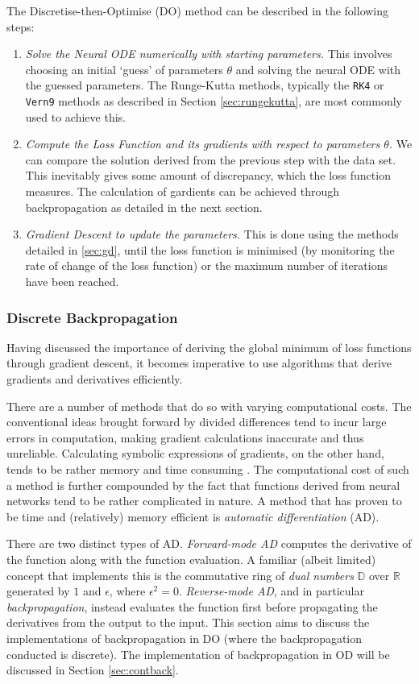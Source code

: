 \documentclass[a4paper,11pt,titlepage]{article}
\theoremstyle{definition}
\theoremstyle{plain}
\theoremstyle{remark}
\begin{document}
The Discretise-then-Optimise (DO) method can be described in the following steps:
\begin{enumerate}
    \item \textit{Solve the Neural ODE numerically with starting parameters.} This involves choosing an initial ‘guess’ of parameters $\theta$ and solving the neural ODE with the guessed parameters. The Runge-Kutta methods, typically the \texttt{RK4} or \texttt{Vern9} methods as described in Section \ref{sec:rungekutta}, are most commonly used to achieve this.
    \item \textit{Compute the Loss Function and its gradients with respect to parameters $\theta$.} We can compare the solution derived from the previous step with the data set. This inevitably gives some amount of discrepancy, which the loss function measures. The calculation of gardients can be achieved through backpropagation as detailed in the next section.
    \item \textit{Gradient Descent to update the parameters.} This is done using the methods detailed in \ref{sec:gd}, until the loss function is minimised (by monitoring the rate of change of the loss function) or the maximum number of iterations have been reached.
\end{enumerate}

\subsubsection{Discrete Backpropagation}
\label{sec:ad}

Having discussed the importance of deriving the global minimum of loss functions through gradient descent, it becomes imperative to use algorithms that derive gradients and derivatives efficiently. 

There are a number of methods that do so with varying computational costs. The conventional ideas brought forward by divided differences tend to incur large errors in computation, making gradient calculations inaccurate and thus unreliable. Calculating symbolic expressions of gradients, on the other hand, tends to be rather memory and time consuming \cite{tucker2011}. The computational cost of such a method is further compounded by the fact that functions derived from neural networks tend to be rather complicated in nature. A method that has proven to be time and (relatively) memory efficient is \textit{automatic differentiation} (AD). 

There are two distinct types of AD. \textit{Forward-mode AD} computes the derivative of the function along with the function evaluation. A familiar (albeit limited) concept that implements this is the commutative ring of \textit{dual numbers} $\mathbb{D}$ over $\mathbb{R}$ generated by $1$ and $\epsilon$, where $\epsilon^2 = 0$. \textit{Reverse-mode AD}, and in particular \textit{backpropagation}, instead evaluates the function first before propagating the derivatives from the output to the input. This section aims to discuss the implementations of backpropagation in DO (where the backpropagation conducted is discrete). The implementation of backpropagation in OD will be discussed in Section \ref{sec:contback}.
\end{document}
